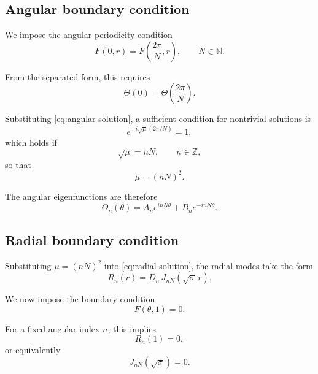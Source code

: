 \documentclass{article}
\begin{document}
\subsection*{\textbf{Angular boundary condition}}

We impose the angular periodicity condition
\begin{equation}
F(0,r) = F\!\left(\frac{2\pi}{N}, r\right),
\qquad N \in \mathbb{N}.
\label{eq:angular-bc}
\end{equation}

From the separated form, this requires
\begin{equation}
\Theta(0) = \Theta\!\left(\frac{2\pi}{N}\right).
\end{equation}

Substituting \eqref{eq:angular-solution}, a sufficient condition for nontrivial solutions is
\begin{equation}
e^{\pm i\sqrt{\mu}(2\pi/N)} = 1,
\end{equation}
which holds if
\begin{equation}
\sqrt{\mu} = nN,
\qquad n \in \mathbb{Z},
\end{equation}
so that
\begin{equation}
\mu = (nN)^2.
\label{eq:mu-quantized}
\end{equation}

The angular eigenfunctions are therefore
\begin{equation}
\Theta_n(\theta)
= A_n e^{i nN \theta}
+ B_n e^{-i nN \theta}.
\label{eq:angular-modes}
\end{equation}

\subsection*{\textbf{Radial boundary condition}}

Substituting \(\mu = (nN)^2\) into \eqref{eq:radial-solution}, the radial modes take the form
\begin{equation}
R_n(r)
= D_n\,J_{nN}\!\left(\sqrt{\sigma}\,r\right).
\label{eq:radial-modes}
\end{equation}

We now impose the boundary condition
\begin{equation}
F(\theta,1) = 0.
\label{eq:radial-bc}
\end{equation}

For a fixed angular index \(n\), this implies
\begin{equation}
R_n(1) = 0,
\end{equation}
or equivalently
\begin{equation}
J_{nN}\!\left(\sqrt{\sigma}\right) = 0.
\label{eq:bessel-zero-condition}
\end{equation}
\end{document}
